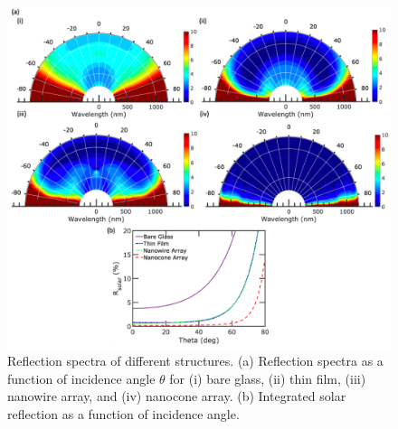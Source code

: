 \documentclass[preprint,12pt]{elsarticle}
\begin{document}
\begin{figure}[H]
\vspace{-10pt}
 \centering
 \includegraphics[width=13.5cm]{Reflection}
\caption{Reflection spectra of different structures.  (a) Reflection spectra as a function of incidence angle $\theta$ for (i) bare glass, (ii) thin film, (iii) nanowire array, and (iv) nanocone array.  
(b) Integrated solar reflection as a function of incidence angle.}
 \label{fig:ARspectra}
 \end{figure}





\end{document}
